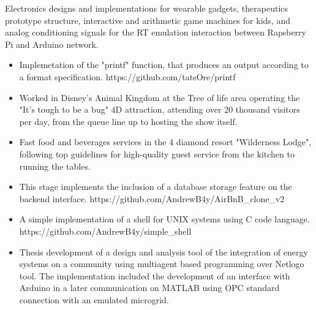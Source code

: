 \documentclass[paper=a4,fontsize=10pt,ragged2e,withhyper]{altacv}%
\begin{document}
\begin{paracol}{2}
\begin{itemize}
Electronics designs and implementations for wearable gadgets, therapeutics prototype structure, interactive and arithmetic game machines for kids, and analog conditioning signals for the RT emulation interaction between Rapsberry Pi and Arduino network. 
\end{itemize}
\divider
{}
\begin{itemize}
 \item Implemetation of the "printf" function, that produces an output according to a format specification.\newline%
https://github.com/tatsOre/printf 
\end{itemize}
\divider
{}
\begin{itemize}
 \item Worked in Disney's Animal Kingdom at the Tree of life area operating the "It's tough to be a bug" 4D attraction, attending over 20 thousand visitors per day, from the queue line up to hosting the show itself. 
\end{itemize}
\divider
{}
\begin{itemize}
 \item Fast food and beverages services in the 4 diamond resort "Wilderness Lodge", following top guidelines for high{-}quality guest service from the kitchen to running the tables. 
\end{itemize}
\divider
{}
\begin{itemize}
 \item This stage implements the inclusion of a database storage feature on the backend interface.\newline%
https://github.com/AndrewB4y/AirBnB\_clone\_v2 
\end{itemize}
\divider
{}
\begin{itemize}
 \item A simple implementation of a shell for UNIX systems using C code language. \newline%
https://github.com/AndrewB4y/simple\_shell 
\end{itemize}%
\begin{itemize}
 \item Thesis development of a design and analysis tool of the integration of energy systems on a community using multiagent based programming over Netlogo tool. The implementation included the development of an interface with Arduino in a later communication on MATLAB using OPC standard connection with an emulated microgrid.\newline%

\end{itemize}
\end{paracol}
\end{document}
